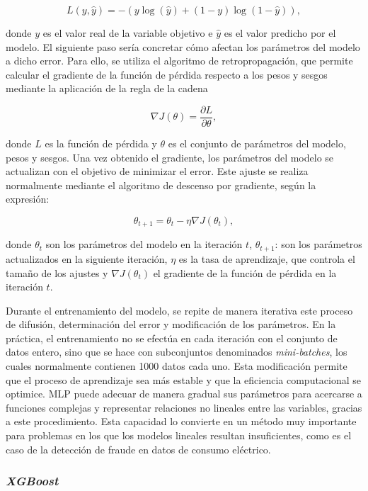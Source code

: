 \documentclass[12pt,a4paper]{report}
\begin{document}
\[
L(y, \hat{y}) = - \left( y \log(\hat{y}) + (1 - y)\log(1 - \hat{y}) \right)
,\]

\noindent donde \(y\) es el valor real de la variable objetivo e \(\hat{y}\) es el valor predicho por el modelo. El siguiente paso sería concretar cómo afectan los parámetros del modelo a dicho error. Para ello, se utiliza el algoritmo de retropropagación, que permite calcular el gradiente de la función de pérdida respecto a los pesos y sesgos mediante la aplicación de la regla de la cadena

\[
\nabla J(\theta) = \frac{\partial L}{\partial \theta}
,\]

\noindent donde \(L\) es la función de pérdida y \(\theta\) es el conjunto de parámetros del modelo, pesos y sesgos. Una vez obtenido el gradiente, los parámetros del modelo se actualizan con el objetivo de minimizar el error. Este ajuste se realiza normalmente mediante el algoritmo de descenso por gradiente, según la expresión:

\[
\theta_{t+1} = \theta_t - \eta \nabla J(\theta_t)
,\]

\noindent donde \(\theta_t\) son los parámetros del modelo en la iteración \(t\), \(\theta_{t+1}\): son los parámetros actualizados en la siguiente iteración, \(\eta\) es la tasa de aprendizaje, que controla el tamaño de los ajustes y \(\nabla J(\theta_t)\) el gradiente de la función de pérdida en la iteración \(t\).

Durante el entrenamiento del modelo, se repite de manera iterativa este proceso de difusión, determinación del error y modificación de los parámetros. En la práctica, el entrenamiento no se efectúa en cada iteración con el conjunto de datos entero, sino que se hace con subconjuntos denominados \emph{mini-batches}, los cuales normalmente contienen 1000 datos cada uno. Esta modificación permite que el proceso de aprendizaje sea más estable y que la eficiencia computacional se optimice. MLP puede adecuar de manera gradual sus parámetros para acercarse a funciones complejas y representar relaciones no lineales entre las variables, gracias a este procedimiento. Esta capacidad lo convierte en un método muy importante para problemas en los que los modelos lineales resultan insuficientes, como es el caso de la detección de fraude en datos de consumo eléctrico.


\subsubsection{\emph{XGBoost}}
\end{document}
